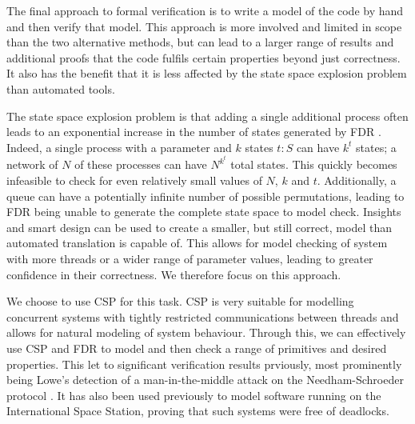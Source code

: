 The final approach to formal verification is to write a model of the code by hand and then verify that model. This approach is more involved and limited in scope than the two alternative methods, but can lead to a larger range of results and additional proofs that the code fulfils certain properties beyond just correctness. It also has the benefit that it is less affected by the state space explosion problem than automated tools. 

The state space explosion problem is that adding a single additional process often leads to an exponential increase in the number of states generated by FDR \cite{RoscoeUCS}. Indeed, a single process with a parameter and $k$ states $t : S$ can have $k^{t}$ states; a network of $N$ of these processes can have $N^{k^{t}}$ total states. This quickly becomes infeasible to check for even relatively small values of $N$, $k$ and $t$. Additionally, a queue can have a potentially infinite number of possible permutations, leading to FDR being unable to generate the complete state space to model check. Insights and smart design can be used to create a smaller, but still correct, model than automated translation is capable of. This allows for model checking of system with more threads or a wider range of parameter values, leading to greater confidence in their correctness. We therefore focus on this approach.




We choose to use CSP for this task. CSP is very suitable for modelling concurrent systems with tightly restricted communications between threads \cite{Lawrence2005} and allows for natural modeling of system behaviour. Through this, we can effectively use CSP and FDR to model and then check a range of primitives and desired properties. This let to significant verification results prviously, most prominently being Lowe's detection of a man-in-the-middle attack on the Needham-Schroeder protocol \cite{LoweNeedham}. It has also been used previously to model software running on the International Space Station, proving that such systems were free of deadlocks\cite{DeadlockAnalysis}. 

